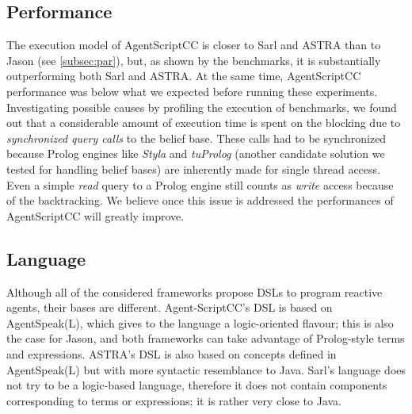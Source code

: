 \subsection{Performance}
The execution model of AgentScriptCC is closer to Sarl and ASTRA than to Jason (see \ref{subsec:par}), but, as shown by the benchmarks, it is substantially outperforming both Sarl and ASTRA. At the same time, AgentScriptCC performance was below what we expected before running these experiments. Investigating possible causes by profiling the execution of benchmarks, we found out that a considerable amount of execution time is spent on the blocking due to \textit{synchronized query calls} to the belief base. These calls had to be synchronized because Prolog engines like \textit{Styla} and \textit{tuProlog} \cite{tuprolog} (another candidate solution we tested for handling belief bases) are inherently made for single thread access. Even a simple \textit{read} query to a Prolog engine still counts as \textit{write} access because of the backtracking.
We believe once this issue is addressed the performances of AgentScriptCC will greatly improve.


\subsection{Language}

Although all of the considered frameworks propose DSLs to program reactive agents, their bases are different. %
Agent-ScriptCC's DSL is based on AgentSpeak(L), which gives to the language a logic-oriented flavour; this is also the case for Jason, and both frameworks can take advantage of Prolog-style terms and expressions. ASTRA's DSL is also based on concepts defined in AgentSpeak(L) but with more syntactic resemblance to Java. Sarl's language does not try to be a logic-based language, therefore it does not contain components corresponding to terms or expressions; it is rather very close to Java.



